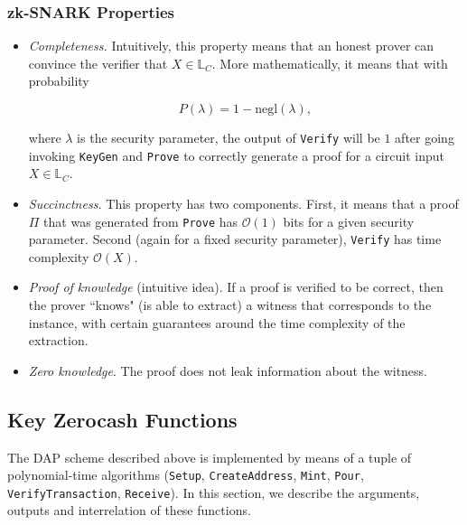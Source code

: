 \documentclass{article}
\begin{document}
\subsubsection{zk-SNARK Properties}
\begin{itemize}
\item \emph{Completeness.} Intuitively, this property means that an honest prover can convince the verifier that $X \in \mathbb{L}_C$. More mathematically, it means that with probability

\begin{equation}
P(\lambda) = 1 - \text{negl}(\lambda),
\end{equation}

where $\lambda$ is the security parameter, the output of \texttt{Verify} will be $1$ after going invoking \texttt{KeyGen} and \texttt{Prove} to correctly generate a proof for a circuit input $X \in \mathbb{L}_C$.

\item \emph{Succinctness.} This property has two components. First, it means that a proof $\Pi$ that was generated from \texttt{Prove} has $\mathcal{O}(1)$ bits for a given security parameter. Second (again for a fixed security parameter), \texttt{Verify} has time complexity $\mathcal{O}(X)$.

\item \emph{Proof of knowledge} (intuitive idea). If a proof is verified to be correct, then the prover ``knows" (is able to extract) a witness that corresponds to the instance, with certain guarantees around the time complexity of the extraction.

\item \emph{Zero knowledge}. The proof does not leak information about the witness.
\end{itemize}

\subsection{Key Zerocash Functions}
The DAP scheme described above is implemented by means of a tuple of polynomial-time algorithms (\texttt{Setup}, \texttt{CreateAddress}, \texttt{Mint}, \texttt{Pour}, \texttt{VerifyTransaction}, \texttt{Receive}). In this section, we describe the arguments, outputs and interrelation of these functions.
\end{document}
